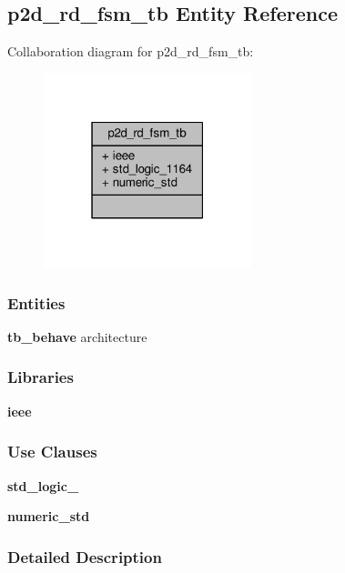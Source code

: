 \subsection{p2d\+\_\+rd\+\_\+fsm\+\_\+tb Entity Reference}
\label{classp2d__rd__fsm__tb}


Collaboration diagram for p2d\+\_\+rd\+\_\+fsm\+\_\+tb\+:\nopagebreak
\begin{figure}[H]
\begin{center}
\leavevmode
\includegraphics[width=171pt]{de/d58/classp2d__rd__fsm__tb__coll__graph}
\end{center}
\end{figure}
\subsubsection*{Entities}
\begin{DoxyCompactItemize}
\item 
{\bf tb\+\_\+behave} architecture
\end{DoxyCompactItemize}
\subsubsection*{Libraries}
 \begin{DoxyCompactItemize}
\item 
{\bf ieee} 
\end{DoxyCompactItemize}
\subsubsection*{Use Clauses}
 \begin{DoxyCompactItemize}
\item 
{\bf std\+\_\+logic\+\_}   
\item 
{\bf numeric\+\_\+std}   
\end{DoxyCompactItemize}


\subsubsection{Detailed Description}



